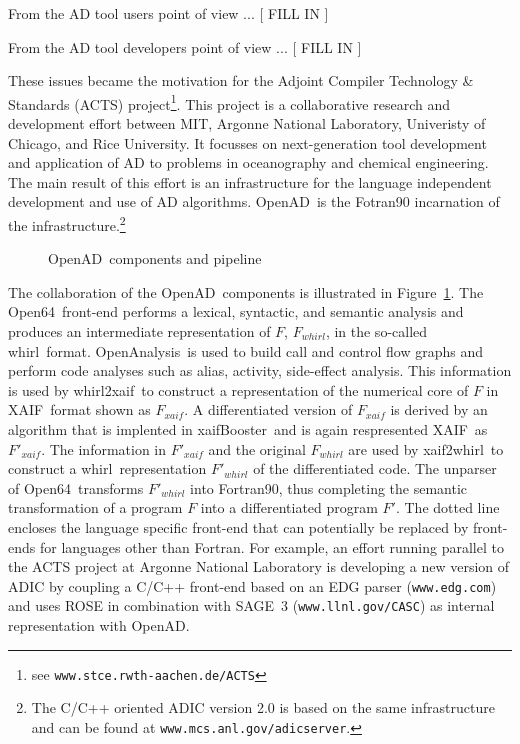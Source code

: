\documentclass[acmtocl,acmnow]{acmtrans2m}
\newcommand{\OpenAD}{OpenAD}
\newcommand{\OpenAnalysis}{OpenAnalysis}
\newcommand{\OpenSixtyFour}{Open64}
\newcommand{\xaif}{XAIF}
\newcommand{\xaifBooster}{xaifBooster}
\newcommand{\whirl}{whirl}
\newcommand{\whirlToxaif}{whirl2xaif}
\newcommand{\xaifTowhirl}{xaif2whirl}
\newcommand{\reffig}[1]{Figure~\ref{#1}}
\begin{document}
From  the AD tool  users point of view ... 
{\color{Red} [ FILL IN ] } 

From the AD tool developers point of view ...
{\color{Red} [ FILL IN ] } 

These issues became the motivation for the 
Adjoint Compiler Technology \& Standards (ACTS) project\footnote{ 
see {\tt www.stce.rwth-aachen.de/ACTS}
}. 
This project is a collaborative
research and development effort between MIT, Argonne National Laboratory, 
Univeristy of Chicago, and Rice University. 
It focusses on  next-generation tool development and 
application of AD to problems in oceanography and chemical engineering.
The main result of this effort is an infrastructure for the language independent 
development and use of AD algorithms. 
\OpenAD\ is the Fotran90 incarnation of the infrastructure.\footnote{
The C/C++ oriented ADIC version 2.0 is based on the same infrastructure and can be found
at {\tt www.mcs.anl.gov/adicserver}.
}
\begin{figure}
\caption{\OpenAD\ components and pipeline} \label{fig:overview}
\end{figure}
The collaboration  of the \OpenAD\  components is illustrated in 
\reffig{fig:overview}.
The \OpenSixtyFour\ front-end performs a lexical, 
syntactic, and semantic analysis and produces an 
intermediate representation of $F$, $F_{\whirl}$, in the so-called \whirl\ format.
\OpenAnalysis\ is used to build call and control flow graphs and  perform 
code analyses such as alias, activity, side-effect analysis.
This information is used by 
\whirlToxaif\ to construct a representation of the numerical core of $F$ in
\xaif\ format shown as $F_{xaif}$.  
A differentiated version of $F_{xaif}$ is derived by an 
algorithm that is implented in \xaifBooster\ and is again respresented 
\xaif\ as $F'_{xaif}$.
The information in $F'_{xaif}$ and the original $F_{\whirl}$ are used by 
\xaifTowhirl\ to construct a 
\whirl\ representation $F'_{\whirl}$ of the differentiated code. 
The unparser of 
\OpenSixtyFour\ transforms $F'_{\whirl}$ into Fortran90, thus completing
the semantic transformation of a program $F$ into
a differentiated program $F'$.
The dotted line encloses the language specific front-end that can potentially
be replaced by front-ends for languages other than Fortran. 
For example, an 
effort running parallel to the ACTS project at Argonne National Laboratory is 
developing a new version of ADIC \cite{HoNo01} by coupling a C/C++ 
front-end 
based on an EDG parser ({\tt www.edg.com}) and uses ROSE in combination with SAGE~3 ({\tt www.llnl.gov/CASC}) as internal representation
with \OpenAD.
\end{document}
